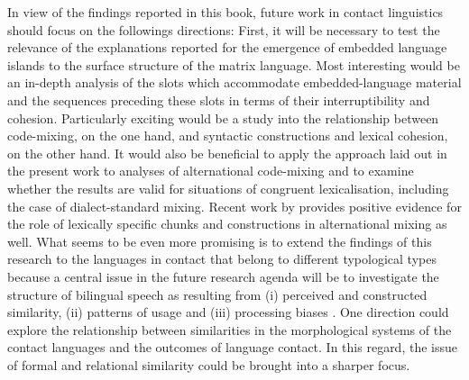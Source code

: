 In view of the findings reported in this book, future work in contact linguistics should focus on the followings directions: First, it will be necessary to test the relevance of the explanations reported for the emergence of embedded language islands to the surface structure of the matrix language. Most interesting would be an in-depth analysis of the slots which accommodate embedded-language material and the sequences preceding these slots in terms of their interruptibility and cohesion. Particularly exciting would be a study into the relationship between code-mixing, on the one hand, and syntactic constructions and lexical cohesion, on the other hand. It would also be beneficial to apply the approach laid out in the present work to analyses of alternational code-mixing and to examine whether the results are valid for situations of congruent lexicalisation, including the case of dialect-standard mixing. Recent work by \cite{goria-units} provides positive evidence for the role of lexically specific chunks and constructions in alternational mixing as well. What seems to be even more promising is to extend the findings of this research to the languages in contact that belong to different typological types because a central issue in the future research agenda will be to investigate the structure of bilingual speech as resulting from (i) perceived and constructed similarity, (ii) patterns of usage and (iii) processing biases \citep[see the papers in][]{hakimov-backus-20}. One direction could explore the relationship between similarities in the morphological systems of the contact languages and the outcomes of language contact. In this regard, the issue of formal and relational similarity could be brought into a sharper focus.